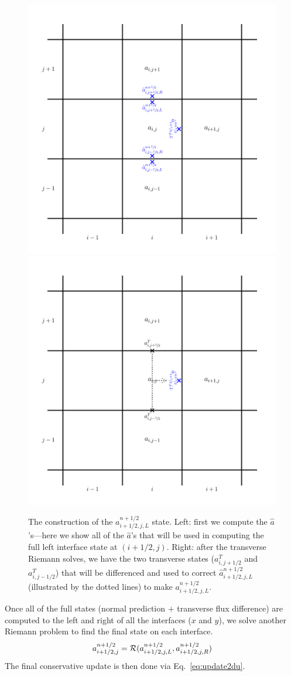 \begin{figure}
\centering
\includegraphics[width=0.495\linewidth]{2dgrid-hat}
\includegraphics[width=0.495\linewidth]{2dgrid-transverse}
\caption[The construction of an interface state with the transverse
  component.]{\label{fig:unsplitstates} The construction of the
  $a_{i+1/2,j,L}^{n+1/2}$ state.  Left: first we compute the
  $\hat{a}$'s---here we show all of the $\hat{a}$'s that will be used
  in computing the full left interface state at $(i+1/2,j)$.  Right:
  after the transverse Riemann solves, we have the two transverse
  states ($a^T_{i,j+1/2}$ and $a^T_{i,j-1/2}$) that will be
  differenced and used to correct $\hat{a}_{i+1/2,j,L}^{n+1/2}$
  (illustrated by the dotted lines) to make $a_{i+1/2,j,L}^{n+1/2}$.}
\end{figure}

Once all of the full states (normal prediction $+$ transverse flux
difference) are computed to the left and right of all the interfaces
($x$ and $y$), we solve another Riemann problem to find the final 
state on each interface.
\begin{equation}
a_{i+1/2,j}^{n+1/2} = \mathcal{R}(a_{i+1/2,j,L}^{n+1/2},
                                  a_{i+1/2,j,R}^{n+1/2}) \\
\end{equation}
The final conservative update is then done via Eq.~\ref{eq:update2du}.


